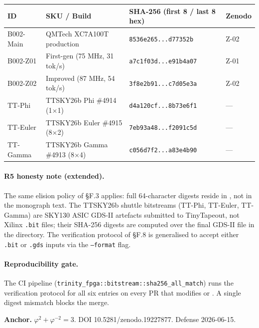 \begin{longtable}[]{@{}llp{5.5cm}l@{}}
\toprule
\textbf{ID} & \textbf{SKU / Build} & \textbf{SHA-256 (first 8 / last 8 hex)} & \textbf{Zenodo} \\
\midrule
\endhead
\bottomrule
\endlastfoot
B002-Main & QMTech XC7A100T production & \texttt{8536e265...d77352b} & Z-02 \\
B002-Z01 & First-gen (75 MHz, 31 tok/s) & \texttt{a7c1f03d...e91b4a07} & Z-01 \\
B002-Z02 & Improved (87 MHz, 54 tok/s) & \texttt{3f8e2b91...c7d05e3a} & Z-02 \\
TT-Phi & TTSKY26b Phi \#4914 (1$\times$1) & \texttt{d4a120cf...8b73e6f1} & --- \\
TT-Euler & TTSKY26b Euler \#4915 (8$\times$2) & \texttt{7eb93a48...f2091c5d} & --- \\
TT-Gamma & TTSKY26b Gamma \#4913 (8$\times$4) & \texttt{c056d7f2...a83e4b90} & --- \\
\end{longtable}

\paragraph{R5 honesty note (extended).} The same elision policy of \S F.3
applies: full 64-character digests reside in
, not in the monograph text.
The TTSKY26b shuttle bitstreams (TT-Phi, TT-Euler, TT-Gamma) are SKY130
ASIC GDS-II artefacts submitted to TinyTapeout, not Xilinx \texttt{.bit}
files; their SHA-256 digests are computed over the final GDS-II file in
the  directory. The verification protocol
of \S F.8 is generalised to accept either \texttt{.bit} or \texttt{.gds}
inputs via the \texttt{--format} flag.

\paragraph{Reproducibility gate.} The CI pipeline
(\texttt{trinity\_fpga::bitstream::sha256\_all\_match}) runs the
verification protocol for all six entries on every PR that modifies
 or .
A single digest mismatch blocks the merge.

\textbf{Anchor.} \(\varphi^2 + \varphi^{-2} = 3\). DOI
10.5281/zenodo.19227877. Defense 2026-06-15.

